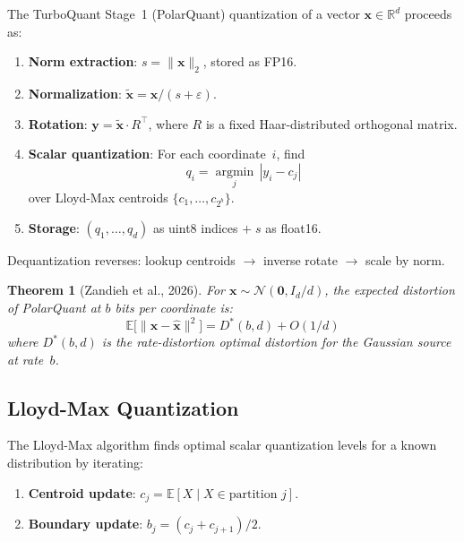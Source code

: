 \documentclass[11pt,a4paper]{article}
\newtheorem{theorem}{Theorem}
\begin{document}
The TurboQuant Stage~1 (PolarQuant) quantization of a vector $\mathbf{x} \in \mathbb{R}^d$ proceeds as:

\begin{enumerate}[label=\arabic*.]
  \item \textbf{Norm extraction}: $s = \|\mathbf{x}\|_2$, stored as FP16.
  \item \textbf{Normalization}: $\tilde{\mathbf{x}} = \mathbf{x} / (s + \varepsilon)$.
  \item \textbf{Rotation}: $\mathbf{y} = \tilde{\mathbf{x}} \cdot R^\top$, where $R$ is a fixed Haar-distributed orthogonal matrix.
  \item \textbf{Scalar quantization}: For each coordinate~$i$, find
    \begin{equation}
      q_i = \operatorname*{argmin}_{j} \, |y_i - c_j|
    \end{equation}
    over Lloyd-Max centroids $\{c_1, \ldots, c_{2^b}\}$.
  \item \textbf{Storage}: $(q_1, \ldots, q_d)$ as uint8 indices $+\; s$ as float16.
\end{enumerate}

Dequantization reverses: lookup centroids $\to$ inverse rotate $\to$ scale by norm.

\begin{theorem}[Zandieh et al., 2026]
For $\mathbf{x} \sim \mathcal{N}(\mathbf{0}, I_d / d)$, the expected distortion of PolarQuant at $b$ bits per coordinate is:
\begin{equation}\label{eq:distortion}
  \mathbb{E}\bigl[\|\mathbf{x} - \hat{\mathbf{x}}\|^2\bigr] = D^*(b, d) + O(1/d)
\end{equation}
where $D^*(b, d)$ is the rate-distortion optimal distortion for the Gaussian source at rate~$b$.
\end{theorem}

\subsection{Lloyd-Max Quantization}

The Lloyd-Max algorithm finds optimal scalar quantization levels for a known distribution by iterating:

\begin{enumerate}[label=\arabic*.]
  \item \textbf{Centroid update}: $c_j = \mathbb{E}[X \mid X \in \text{partition } j]$.
  \item \textbf{Boundary update}: $b_j = (c_j + c_{j+1}) / 2$.
\end{enumerate}
\end{document}
